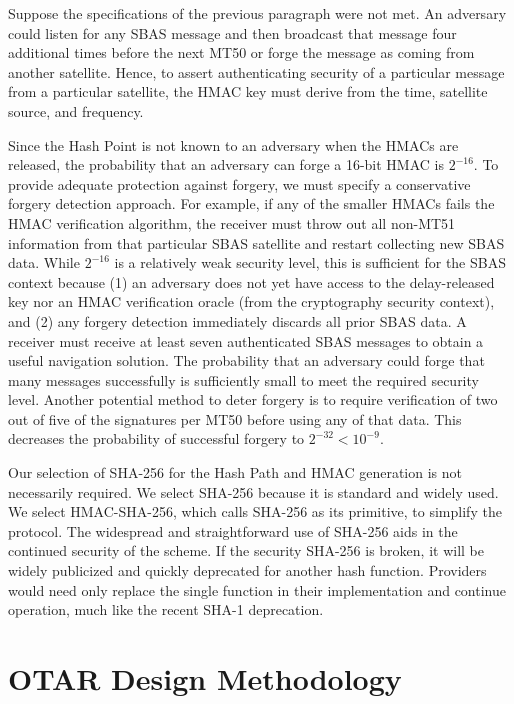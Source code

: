 \documentclass[letterpaper,times]{IONconf/IONconf}
\begin{document}
		Suppose the specifications of the previous paragraph were not met.
		An adversary could listen for any SBAS message and then broadcast that message four additional times before the next MT50 or forge the message as coming from another satellite.
		Hence, to assert authenticating security of a particular message from a particular satellite, the HMAC key must derive from the time, satellite source, and frequency.

		Since the Hash Point is not known to an adversary when the HMACs are released, the probability that an adversary can forge a 16-bit HMAC is $2^{-16}$.
		To provide adequate protection against forgery, we must specify a conservative forgery detection approach.
		For example, if any of the smaller HMACs fails the HMAC verification algorithm, the receiver must throw out all non-MT51 information from that particular SBAS satellite and restart collecting new SBAS data.
		While $2^{-16}$ is a relatively weak security level, this is sufficient for the SBAS context because (1) an adversary does not yet have access to the delay-released key nor an HMAC verification oracle (from the cryptography security context), and (2) any forgery detection immediately discards all prior SBAS data.
		A receiver must receive at least seven authenticated SBAS messages to obtain a useful navigation solution.
		The probability that an adversary could forge that many messages successfully is {}sufficiently small to meet the required security level.
		Another potential method to deter forgery is to require verification of two out of five of the signatures per MT50 before using any of that data.
		This decreases the probability of successful forgery to $2^{-32} < 10^{-9}$.		

		Our selection of SHA-256 for the Hash Path and HMAC generation is not necessarily required.
		We select SHA-256 because it is standard and widely used.
		We select HMAC-SHA-256, which calls SHA-256 as its primitive, to simplify the protocol.
		The widespread and straightforward use of SHA-256 aids in the continued security of the scheme.
		If the security SHA-256 is broken, it will be widely publicized and quickly deprecated for another hash function.
		Providers would need only replace the single function in their implementation and continue operation, much like the recent SHA-1 deprecation.

\section{OTAR Design Methodology} \label{sec:otar_design_methodology}
\end{document}
